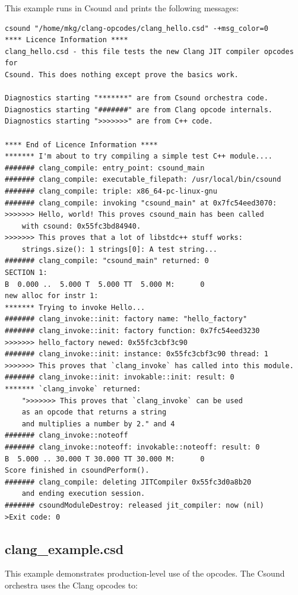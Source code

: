 \documentclass[letterpaper, 12pt]{article}
\begin{document}
This example runs in Csound and prints the following messages:

\begin{Verbatim}[fontfamily=courier, xleftmargin=\parindent]
csound "/home/mkg/clang-opcodes/clang_hello.csd" -+msg_color=0
**** Licence Information ****
clang_hello.csd - this file tests the new Clang JIT compiler opcodes for 
Csound. This does nothing except prove the basics work.

Diagnostics starting "*******" are from Csound orchestra code.
Diagnostics starting "#######" are from Clang opcode internals.
Diagnostics starting ">>>>>>>" are from C++ code.

**** End of Licence Information ****
******* I'm about to try compiling a simple test C++ module....
####### clang_compile: entry_point: csound_main
####### clang_compile: executable_filepath: /usr/local/bin/csound
####### clang_compile: triple: x86_64-pc-linux-gnu
####### clang_compile: invoking "csound_main" at 0x7fc54eed3070:
>>>>>>> Hello, world! This proves csound_main has been called 
	with csound: 0x55fc3bd84940.
>>>>>>> This proves that a lot of libstdc++ stuff works: 
	strings.size(): 1 strings[0]: A test string...
####### clang_compile: "csound_main" returned: 0
SECTION 1:
B  0.000 ..  5.000 T  5.000 TT  5.000 M:      0  
new alloc for instr 1:
******* Trying to invoke Hello...
####### clang_invoke::init: factory name: "hello_factory"
####### clang_invoke::init: factory function: 0x7fc54eed3230
>>>>>>> hello_factory newed: 0x55fc3cbf3c90
####### clang_invoke::init: instance: 0x55fc3cbf3c90 thread: 1
>>>>>>> This proves that `clang_invoke` has called into this module.
####### clang_invoke::init: invokable::init: result: 0
******* `clang_invoke` returned: 
	">>>>>>> This proves that `clang_invoke` can be used 
	as an opcode that returns a string 
	and multiplies a number by 2." and 4
####### clang_invoke::noteoff
####### clang_invoke::noteoff: invokable::noteoff: result: 0
B  5.000 .. 30.000 T 30.000 TT 30.000 M:      0  
Score finished in csoundPerform().
####### clang_compile: deleting JITCompiler 0x55fc3d0a8b20 
	and ending execution session.
####### csoundModuleDestroy: released jit_compiler: now (nil)
>Exit code: 0
\end{Verbatim}

\subsection{clang\_example.csd}

This example demonstrates production-level use of the opcodes. The Csound orchestra uses the Clang opcodes to:
\end{document}
